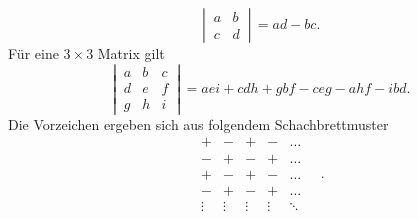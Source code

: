 \documentclass[a4paper,12pt]{article}
\numberwithin{equation}{section}
\begin{document}
\[ 
        \,\left|\, \begin{matrix}
                a&b\\c&d
        \end{matrix}\,\right|\, =ad-bc
.\] 
Für eine $3\times 3$ Matrix gilt
\[ 
        \,\left|\, \begin{matrix}
                a&b&c\\d&e&f\\g&h&i
        \end{matrix}\,\right|\, =aei+cdh+gbf-ceg-ahf-ibd
.\] 
Die Vorzeichen ergeben sich aus folgendem Schachbrettmuster
\[
        \begin{matrix}
                +&-&+&-&\hdots \\
                -&+&-&+&\hdots \\
                +&-&+&-&\hdots \\
                -&+&-&+&\hdots \\
                \vdots &\vdots &\vdots &\vdots &\ddots
        \end{matrix}
\quad.\]
\end{document}
